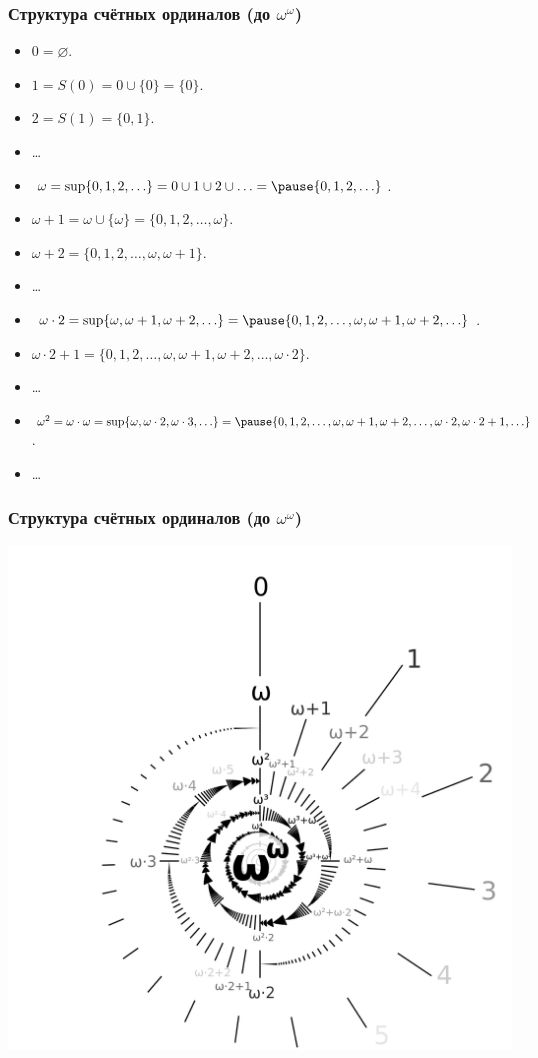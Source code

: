 \documentclass[10pt]{beamer}
\begin{document}
\begin{frame}
    \frametitle{Структура счётных ординалов (до $\omega^\omega$)}
    \begin{itemize}
        \item $0 = \varnothing$.
        \item $1 = S(0) = 0 \cup \{0\} = \{0\}$. \pause
        \item $2 = S(1) = \{0,1\}$.
        \item \ldots \pause
        \item $\omega = \sup \{0,1,2,\ldots\} = 0 \cup 1 \cup 2 \cup \ldots = \pause \{0,1,2,\ldots\}$. \pause
        \item $\omega + 1 = \omega \cup \{\omega\} = \{0,1,2,\ldots,\omega\}$.
        \item $\omega + 2 = \{0,1,2,\ldots,\omega,\omega + 1\}$.
        \item \ldots \pause
        \item $\omega \cdot 2 = \sup \{\omega, \omega + 1, \omega + 2, \ldots\} = \pause \{0,1,2,\ldots, \omega, \omega + 1, \omega + 2, \ldots\}$.
        \item $\omega \cdot 2 + 1 = \{0,1,2,\ldots, \omega, \omega + 1, \omega + 2, \ldots, \omega \cdot 2\}$.
        \item \ldots \pause
        \item $\omega^2 = \omega \cdot \omega = \sup \{\omega, \omega \cdot 2, \omega \cdot 3, \ldots\} = \pause \{0,1,2,\ldots, \omega, \omega + 1, \omega + 2, \ldots, \omega \cdot 2, \omega \cdot 2 + 1, \ldots\}$.
        \item \ldots
    \end{itemize}
\end{frame}

\begin{frame}
    \frametitle{Структура счётных ординалов (до $\omega^\omega$)}
    \centering
    \includegraphics[width=\textwidth,height=0.9\textheight,keepaspectratio]{Omega-exp-omega.svg.png}
\end{frame}
\end{document}
